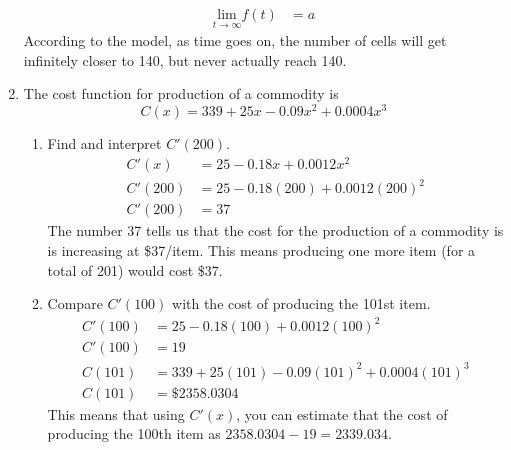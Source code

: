 \documentclass{article}
\begin{document}
\begin{enumerate}
$$\begin{align}
		\underset{t\rightarrow\infty}{\text{lim}}f(t)&=a
	\end{align}$$
	According to the model, as time goes on, the number of cells will get infinitely closer to 140, but never actually reach 140.
\setcounter{enumi}{29}
	\item The cost function for production of a commodity is $$C(x)=339+25x-0.09x^2+0.0004x^3$$
	\begin{enumerate}
		\item Find and interpret $C'(200)$.
		$$\begin{align}
			C'(x)&=25-0.18x+0.0012x^2\\
			C'(200)&=25-0.18(200)+0.0012(200)^2\\
			C'(200)&=37
		\end{align}$$
		The number 37 tells us that the cost for the production of a commodity is is increasing at \$37/item. This means producing one more item (for a total of 201) would cost \$37.
		\item Compare $C'(100)$ with the cost of producing the 101st item.
		$$\begin{align}
			C'(100)&=25-0.18(100)+0.0012(100)^2\\
			C'(100)&=19\\
			C(101)&=339+25(101)-0.09(101)^2+0.0004(101)^3\\
			C(101)&=\$2358.0304
		\end{align}$$
		This means that using $C'(x)$, you can estimate that the cost of producing the 100th item as $2358.0304-19=2339.034$.
	\end{enumerate}
\end{enumerate}
\pagebreak
\end{document}
